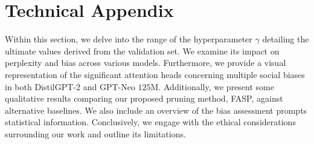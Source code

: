\documentclass[letterpaper]{article} %
\begin{document}



\clearpage
\appendix
\section{Technical Appendix}
Within this section, we delve into the range of the hyperparameter $\gamma$ detailing the ultimate values derived from the validation set. We examine its impact on perplexity and bias across various models. Furthermore, we provide a visual representation of the significant attention heads concerning multiple social biases in both DistilGPT-2 and GPT-Neo $125$M. Additionally, we present some qualitative results comparing our proposed pruning method, FASP, against alternative baselines. We also include an overview of the bias assessment prompts statistical information. Conclusively, we engage with the ethical considerations surrounding our work and outline its limitations.
\end{document}
